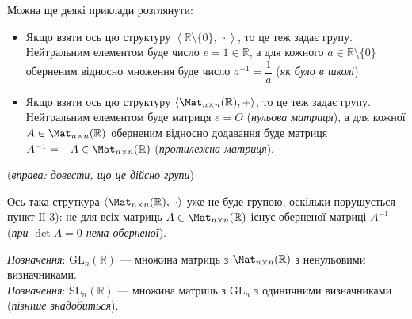 \documentclass{math_library}
\begin{document}
\begin{example}
Можна ще деякі приклади розглянути:
\begin{itemize}
\item Якщо взяти ось цю структуру $\left< \mathbb{R} \setminus \{0\},\ \cdot \right>$, то це теж задає групу. Нейтральним елементом буде число $e = 1 \in \mathbb{R}$, а для кожного $a \in \mathbb{R} \setminus \{0\}$ оберненим відносно множення буде число $a^{-1} = \dfrac{1}{a}$ (\textit{як було в школі}).

\item Якщо взяти ось цю структуру $\left< \Mat_{n \times n}(\mathbb{R}),+\right>$, то це теж задає групу. Нейтральним елементом буде матриця $e = O$ (\textit{нульова матриця}), а для кожної $A \in \Mat_{n \times n}(\mathbb{R})$ оберненим відносно додавання буде матриця $A^{-1} = -A \in \Mat_{n \times n}(\mathbb{R})$ (\textit{протилежна матриця}).
\end{itemize}

(\textit{вправа: довести, що це дійсно групи})
\end{example}

\begin{example}
Ось така струткура $\left< \Mat_{n \times n}(\mathbb{R}),\ \cdot \right>$ уже не буде групою, оскільки порушується пункт ІІ 3): не для всіх матриць $A \in \Mat_{n \times n}(\mathbb{R})$ існує оберненої матриці $A^{-1}$ (\textit{при $\det A = 0$ нема оберненої}).
\end{example}

\textit{Позначення}: $\mathrm{GL}_n(\mathbb{R})$ --- множина матриць з $\Mat_{n \times n}(\mathbb{R})$ з ненульовими визначниками.\\
\textit{Позначення}: $\mathrm{SL}_n(\mathbb{R})$ --- множина матриць з $\mathrm{GL}_n$ з одиничними визначниками (\textit{пізніше знадобиться}).
\end{document}
